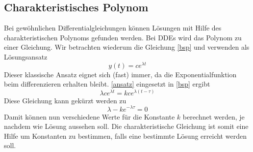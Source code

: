 \subsection{Charakteristisches Polynom}
Bei gewöhnlichen Differentialgleichungen können Lösungen mit Hilfe des charakteristischen Polynoms gefunden werden. 
Bei DDEs wird das Polynom zu einer Gleichung. 
Wir betrachten wiederum die Gleichung \ref{bsp} und verwenden als Lösungsansatz
\begin{equation}\label{ansatz}
	y(t) = ce^{\lambda t}
\end{equation}
Dieser klassische Ansatz eignet sich (fast) immer, da die Exponentialfunktion beim differenzieren erhalten bleibt. 
\ref{ansatz} eingesetzt in \ref{bsp} ergibt
\begin{equation}
	\lambda ce^{\lambda t} = kce^{\lambda (t-\tau )}
\end{equation} 
Diese Gleichung kann gekürzt werden zu
\begin{equation}
\lambda  - ke^{-\lambda \tau}= 0
\end{equation} 
Damit können nun verschiedene Werte für die Konstante $k$ berechnet werden, je nachdem wie Lösung aussehen soll. 
Die charakteristische Gleichung ist somit  eine Hilfe um Konstanten zu bestimmen, falls eine bestimmte Lösung erreicht werden soll.